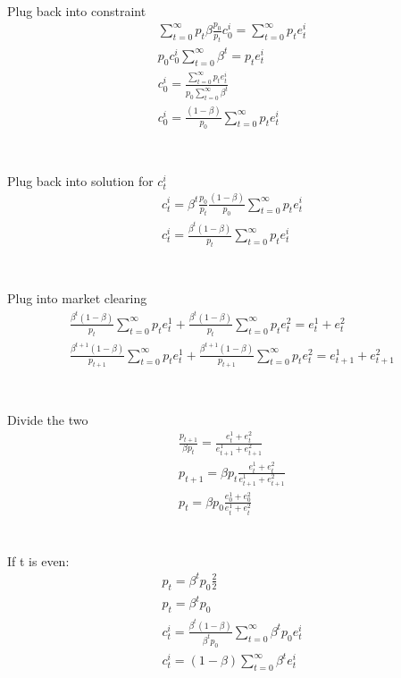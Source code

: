 \documentclass[10pt, a4paper]{article}
\begin{document}
      \\
      Plug back into constraint
      \begin{gather*}
        \sum\limits_{t=0}^{\infty}p_t\beta\frac{p_0}{p_t}c_0^i = \sum\limits_{t=0}^{\infty}p_te_t^i \\
        p_0c_0^i\sum\limits_{t=0}^{\infty}\beta^t = p_te_t^i \\
        c_0^i = \frac{\sum\limits_{t=0}^{\infty}p_te_t^i}{p_0\sum\limits_{t=0}^{\infty}\beta^t} \\
        c_0^i = \frac{(1-\beta)}{p_0}\sum\limits_{t=0}^{\infty}p_te_t^i \\
      \end{gather*} \\
      \\
      Plug back into solution for $c_t^i$
      \begin{gather*}
        c_t^i =\beta^t \frac{p_0}{p_t}\frac{(1-\beta)}{p_0}\sum\limits_{t=0}^{\infty}p_te_t^i \\
        c_t^i = \frac{\beta^t(1-\beta)}{p_t}\sum\limits_{t=0}^{\infty}p_te_t^i\\
      \end{gather*} \\
      \\
      Plug into market clearing
      \begin{gather*}
        \frac{\beta^t(1-\beta)}{p_t}\sum\limits_{t=0}^{\infty}p_te_t^1 + \frac{\beta^t(1-\beta)}{p_t}\sum\limits_{t=0}^{\infty}p_te_t^2 = e_t^1+e_t^2 \\
        \frac{\beta^{t+1}(1-\beta)}{p_{t+1}}\sum\limits_{t=0}^{\infty}p_{t}e_{t}^1 + \frac{\beta^{t+1}(1-\beta)}{p_{t+1}}\sum\limits_{t=0}^{\infty}p_te_{t}^2 = e_{t+1}^1 + e_{t+1}^2 \\
      \end{gather*} \\
      \\
      Divide the two
      \begin{gather*}
        \frac{p_{t+1}}{\beta p_t} = \frac{e_t^1+e_t^2}{e_{t+1}^1+e_{t+1}^2} \\
        p_{t+1} = \beta p_t\frac{e_t^1+e_t^2}{e_{t+1}^1+e_{t+1}^2} \\
        \boxed{p_t = \beta p_0\frac{e_0^1+e_0^2}{e_{t}^1+e_{t}^2}}
      \end{gather*} \\
      \\
      If t is even:
      \begin{gather*}
        p_t = \beta^tp_0\frac{2}{2} \\
        \boxed{p_t = \beta^tp_0} \\
        c_t^i = \frac{\beta^t(1-\beta)}{\beta^tp_0}\sum\limits_{t=0}^{\infty}\beta^tp_0e_t^i \\
        c_t^i = (1-\beta)\sum\limits_{t=0}^{\infty}\beta^te_t^i \\
      \end{gather*}
\end{document}
